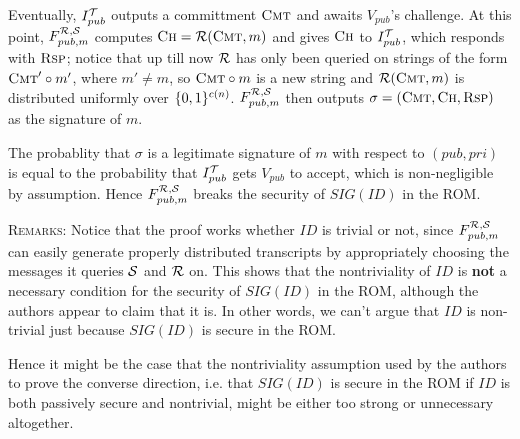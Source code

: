 \documentclass[12pt,twoside]{article}
\begin{document}
\begin{enumerate}
Eventually, $I_{pub}^{\mathcal{T}}$ outputs a committment $\textsc{Cmt}$ and awaits 
$V_{pub}$'s challenge. At this point, $F_{pub,m}^{\mathcal{R},\mathcal{S}}$ computes 
$\textsc{Ch} = \mathcal{R}(\textsc{Cmt},m)$ and gives $\textsc{Ch}$ to
$I_{pub}^{\mathcal{T}}$, which responds with $\textsc{Rsp}$; notice that up till now 
$\mathcal{R}$ has only been queried on strings of the form $\textsc{Cmt}' \circ m'$, 
where $m' \neq m$, so $\textsc{Cmt}\circ m$ is a new string and 
$\mathcal{R}(\textsc{Cmt},m)$ is distributed uniformly over $\{0,1\}^{c(n)}$. 
$F_{pub,m}^{\mathcal{R},\mathcal{S}}$ then outputs $\sigma = (\textsc{Cmt},\textsc{Ch},
\textsc{Rsp})$ as the signature of $m$.

The probablity that $\sigma$ is a legitimate signature of $m$ with respect to
$(pub,pri)$ is equal to the probability that $I_{pub}^{\mathcal{T}}$ gets $V_{pub}$ to
accept, which is non-negligible by assumption. Hence $F_{pub,m}^{\mathcal{R},\mathcal{S}}$ 
breaks the security of $SIG(ID)$ in the ROM.

\textsc{Remarks}: Notice that the proof works whether $ID$ is trivial or not,
since $F_{pub,m}^{\mathcal{R},\mathcal{S}}$ can easily generate properly distributed 
transcripts by appropriately choosing the messages it queries $\mathcal{S}$ and 
$\mathcal{R}$ on. This shows that the nontriviality of $ID$ is {\bf not} a necessary 
condition for the security of $SIG(ID)$ in the ROM, although the authors appear 
to claim that it is. In other words, we can't argue that $ID$ is non-trivial 
just because $SIG(ID)$ is secure in the ROM.

Hence it might be the case that the nontriviality assumption used by the
authors to prove the converse direction, i.e. that $SIG(ID)$ is secure in the
ROM if $ID$ is both passively secure and nontrivial, might be either too 
strong or unnecessary altogether.

\end{enumerate}
\end{document}
